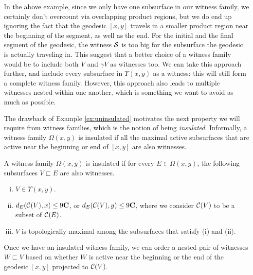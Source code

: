 \documentclass[12pt, reqno]{amsart}
\begin{document}
  In the above example, since we only have one subsurface in our witness family, we certainly don't overcount via overlapping product regions, but we do end up ignoring the fact that the geodesic $[x,y]$ travels in a smaller product region near the beginning of the segment, as well as the end.
  For the initial and the final segment of the geodesic, the witness $\mathcal{S}$ is too big for the subsurface the geodesic is actually traveling in.
  This suggest that a better choice of a witness family would be to include both $V$ and $\gamma V$ as witnesses too.
  We can take this approach further, and include every subsurface in $\Upsilon(x,y)$ as a witness: this will still form a complete witness family.
  However, this approach also leads to multiple witnesses nested within one another, which is something we want to avoid as much as possible.

  The drawback of Example \ref{ex:uninsulated} motivates the next property we will require from witness families, which is the notion of being \emph{insulated}.
  Informally, a witness family $\Omega(x,y)$ is insulated if all the maximal active subsurfaces that are active near the beginning or end of $[x,y]$ are also witnesses.
  \begin{definition}
    \label{def:insulated}
    A witness family $\Omega(x,y)$ is insulated if for every $E \in \Omega(x,y)$, the following subsurfaces $V \sqsubset E$ are also witnesses.
    \begin{enumerate}[(i)]
    \item $V \in \Upsilon(x,y)$.
    \item $d_E(\mathcal{C}(V), x) \leq 9\mathbf{C}$, or $d_E(\mathcal{C}(V), y) \leq 9 \mathbf{C}$, where we consider $\mathcal{C}(V)$ to be a subset of $\mathcal{C}(E)$.
    \item $V$ is topologically maximal among the subsurfaces that satisfy (i) and (ii).
    \end{enumerate}
  \end{definition}

  Once we have an insulated witness family, we can order a nested pair of witnesses $W \sqsubset V$ based on whether $W$ is active near the beginning or the end of the geodesic $[x,y]$ projected to $\mathcal{C}(V)$.
\end{document}
